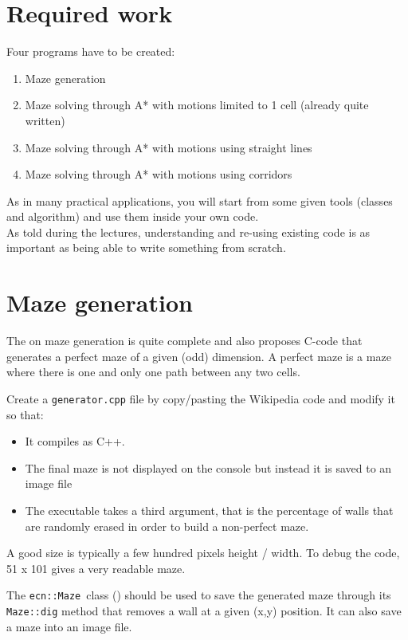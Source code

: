 \documentclass{ecnreport}
\def\maze{\texttt{ecn::Maze}~}
\begin{document}
\section{Required work}

Four programs have to be created: 
\begin{enumerate}
 \item Maze generation
 \item Maze solving through A* with motions limited to 1 cell (already quite written)
 \item Maze solving through A* with motions using straight lines
 \item Maze solving through A* with motions using corridors
\end{enumerate}

As in many practical applications, you will start from some given tools (classes and algorithm) and use them inside your own code.\\
As told during the lectures, understanding and re-using existing code is as important as being able to write something from scratch.

\section{Maze generation}

The  on maze generation is quite complete
and also proposes C-code that generates a perfect maze of a given (odd) dimension. A perfect maze is a maze where there is one and only 
one path between any two cells.

Create a \texttt{generator.cpp} file by copy/pasting the Wikipedia code and modify it so that:
\begin{itemize}
 \item It compiles as C++.
 \item The final maze is not displayed on the console but instead it is saved to an image file 
 \item The executable takes a third argument, that is the percentage of walls that are randomly erased in order to build a non-perfect maze.
\end{itemize}
A good size is typically a few hundred pixels height / width. To debug the code, 51 x 101 gives a very readable maze.

The \maze class () should be used to save the generated maze through its \texttt{Maze::dig} method that removes a wall at a given (x,y) position.
It can also save a maze into an image file.
\end{document}
